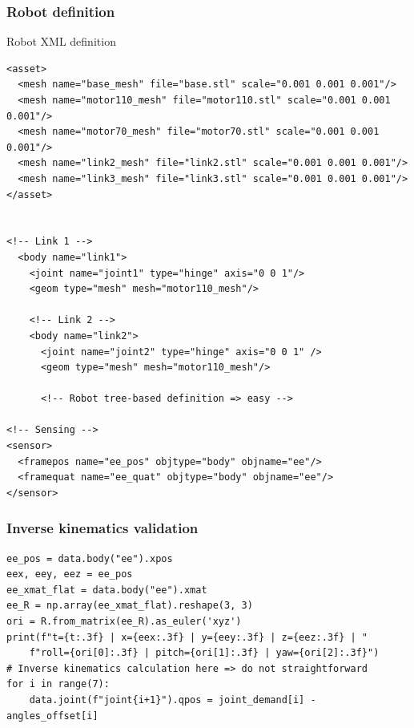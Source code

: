 \documentclass[9pt]{beamer}
\begin{document}
	
		\begin{frame}[fragile]
			\frametitle{Robot definition}
			Robot XML definition
		\begin{verbatim}
<asset>
  <mesh name="base_mesh" file="base.stl" scale="0.001 0.001 0.001"/>
  <mesh name="motor110_mesh" file="motor110.stl" scale="0.001 0.001 0.001"/>
  <mesh name="motor70_mesh" file="motor70.stl" scale="0.001 0.001 0.001"/>
  <mesh name="link2_mesh" file="link2.stl" scale="0.001 0.001 0.001"/>
  <mesh name="link3_mesh" file="link3.stl" scale="0.001 0.001 0.001"/>
</asset>

 
<!-- Link 1 -->
  <body name="link1">
    <joint name="joint1" type="hinge" axis="0 0 1"/>
    <geom type="mesh" mesh="motor110_mesh"/>

    <!-- Link 2 -->
    <body name="link2"> 
      <joint name="joint2" type="hinge" axis="0 0 1" />
      <geom type="mesh" mesh="motor110_mesh"/>
      
      <!-- Robot tree-based definition => easy -->
      
<!-- Sensing -->
<sensor>
  <framepos name="ee_pos" objtype="body" objname="ee"/>
  <framequat name="ee_quat" objtype="body" objname="ee"/>
</sensor>
		\end{verbatim}
		\end{frame}
	
		\begin{frame}[fragile]
			            
			\frametitle{Inverse kinematics validation}
					\begin{verbatim}
ee_pos = data.body("ee").xpos
eex, eey, eez = ee_pos
ee_xmat_flat = data.body("ee").xmat
ee_R = np.array(ee_xmat_flat).reshape(3, 3)
ori = R.from_matrix(ee_R).as_euler('xyz')
print(f"t={t:.3f} | x={eex:.3f} | y={eey:.3f} | z={eez:.3f} | "
	f"roll={ori[0]:.3f} | pitch={ori[1]:.3f} | yaw={ori[2]:.3f}")
# Inverse kinematics calculation here => do not straightforward
for i in range(7):
	data.joint(f"joint{i+1}").qpos = joint_demand[i] - angles_offset[i]
			\end{verbatim}
		
			\begin{figure}
				\scalebox{0.7}{}
			\end{figure}

		\end{frame}
	
\end{document}
